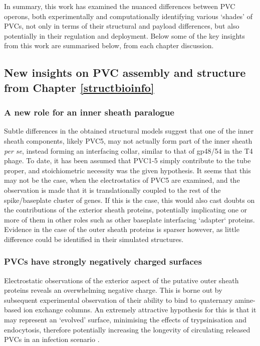In summary, this work has examined the nuanced differences between PVC operons, both experimentally and computationally identifying various `shades' of PVCs, not only in terms of their structural and payload differences, but also potentially in their regulation and deployment. Below some of the key insights from this work are summarised below, from each chapter discussion.

\subsection{New insights on PVC assembly and structure from Chapter \ref{structbioinfo}}
\subsubsection{A new role for an inner sheath paralogue}
Subtle differences in the obtained structural models suggest that one of the inner sheath components, likely PVC5, may not actually form part of the inner sheath \emph{per se}, instead forming an interfacing collar, similar to that of gp48/54 in the T4 phage. To date, it has been assumed that PVC1-5 simply contribute to the tube proper, and stoichiometric necessity was the given hypothesis. It seems that this may not be the case, when the electrostatics of PVC5 are examined, and the observation is made that it is translationally coupled to the rest of the spike/baseplate cluster of genes. If this is the case, this would also cast doubts on the contributions of the exterior sheath proteins, potentially implicating one or more of them in other roles such as other baseplate interfacing `adapter` proteins. Evidence in the case of the outer sheath proteins is sparser however, as little difference could be identified in their simulated structures.

\subsubsection{PVCs have strongly negatively charged surfaces}
Electrostatic observations of the exterior aspect of the putative outer sheath proteins reveals an overwhelming negative charge. This is borne out by subsequent experimental observation of their ability to bind to quaternary amine-based ion exchange columns. An extremely attractive hypothesis for this is that it may represent an `evolved' surface, minimising the effects of trypsinisation and endocytosis, therefore potentially increasing the longevity of circulating released PVCs in an infection scenario \citep{DelTordello2016, Kaur2012}.

